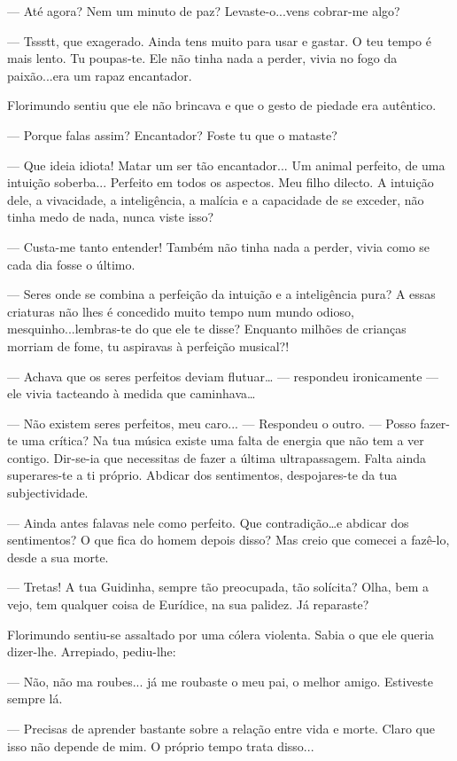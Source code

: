 --- Até agora? Nem um minuto de paz? Levaste-o...vens cobrar-me algo?

--- Tssstt, que exagerado. Ainda tens muito para usar e gastar. O teu
tempo é mais lento. Tu poupas-te. Ele não tinha nada a perder, vivia no
fogo da paixão...era um rapaz encantador.

Florimundo sentiu que ele não brincava e que o gesto de piedade era
autêntico.

--- Porque falas assim? Encantador? Foste tu que o mataste?

--- Que ideia idiota! Matar um ser tão encantador... Um animal perfeito,
de uma intuição soberba... Perfeito em todos os aspectos. Meu filho
dilecto. A intuição dele, a vivacidade, a inteligência, a malícia e a
capacidade de se exceder, não tinha medo de nada, nunca viste isso?

--- Custa-me tanto entender! Também não tinha nada a perder, vivia como se
cada dia fosse o último.

--- Seres onde se combina a perfeição da intuição e a inteligência pura? A
essas criaturas não lhes é concedido muito tempo num mundo odioso,
mesquinho...lembras-te do que ele te disse? Enquanto milhões de crianças
morriam de fome, tu aspiravas à perfeição musical?!

--- Achava que os seres perfeitos deviam flutuar\ldots{} --- respondeu
ironicamente ---  ele vivia tacteando à medida que caminhava\ldots{}

--- Não existem seres perfeitos, meu caro... --- Respondeu o outro. --- Posso
fazer-te uma crítica? Na tua música existe uma falta de energia que não
tem a ver contigo. Dir-se-ia que necessitas de fazer a última
ultrapassagem. Falta ainda superares-te a ti próprio. Abdicar dos
sentimentos, despojares-te da tua subjectividade.

--- Ainda antes falavas nele como perfeito. Que contradição\ldots{}e
abdicar dos sentimentos? O que fica do homem depois disso? Mas creio que
comecei a fazê-lo, desde a sua morte.

--- Tretas! A tua Guidinha, sempre tão preocupada, tão solícita? Olha, bem
a vejo, tem qualquer coisa de Eurídice, na sua palidez. Já reparaste?

Florimundo sentiu-se assaltado por uma cólera violenta. Sabia o que ele
queria dizer-lhe. Arrepiado, pediu-lhe:

--- Não, não ma roubes... já me roubaste o meu pai, o melhor amigo.
Estiveste sempre lá.

--- Precisas de aprender bastante sobre a relação entre vida e morte.
Claro que isso não depende de mim. O próprio tempo trata disso...

